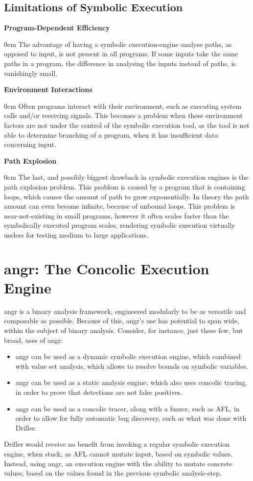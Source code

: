 \documentclass[a4paper]{article}
\newcommand{\tbf}[1]{\textbf{#1}}
\newcommand{\marginwidth}{0.5cm}
\newcommand{\subsubsubsection}[1]{\tbf{#1}\begin{addmargin}[\marginwidth]{0cm}}
\begin{document}
\subsection{Limitations of Symbolic Execution}
\label{sec:LimitsSymEx}
\subsubsubsection{Program-Dependent Efficiency}
The advantage of having a symbolic execution-engine analyse paths, as opposed to input, is not present in all programs. If some inputs take the same paths in a program, the difference in analysing the inputs instead of paths, is vanishingly small.
\end{addmargin}
\subsubsubsection{Environment Interactions}
Often programs interact with their environment, such as executing system calls and/or receiving signals. This becomes a problem when these environment factors are not under the control of the symbolic execution tool, as the tool is not able to determine branching of a program, when it has insufficient data concerning input.
\end{addmargin}
\subsubsubsection{Path Explosion}
The last, and possibly biggest drawback in symbolic execution engines is the path explosion problem. This problem is caused by a program that is containing loops, which causes the amount of path to grow exponentially. In theory the path amount can even become infinite, because of unbound loops. This problem is near-not-existing in small programs, however it often scales faster than the symbolically executed program scales, rendering symbolic execution virtually useless for testing medium to large applications.
\end{addmargin}
\section{angr: The Concolic Execution Engine}
\label{sec:angr}
angr is a binary analysis framework, engineered modularly to be as versatile and composable as possible. Because of this, angr's use has potential to span wide, within the subject of binary analysis. Consider, for instance, just these few, but broad, uses of angr:
\begin{itemize}
	\item angr can be used as a dynamic symbolic execution engine, which combined with value set analysis, which allows to resolve bounds on symbolic variables.
	\item angr can be used as a static analysis engine, which also uses concolic tracing, in order to prove that detections are not false positives.
	\item angr can be used as a concolic tracer, along with a fuzzer, such as AFL, in order to allow for fully automatic bug discovery, such as what was done with Driller.
\end{itemize}
Driller would receive no benefit from invoking a regular symbolic execution engine, when stuck, as AFL cannot mutate input, based on symbolic values. Instead, using angr, an execution engine with the ability to mutate concrete values, based on the values found in the previous symbolic analysis-step.
\end{document}
